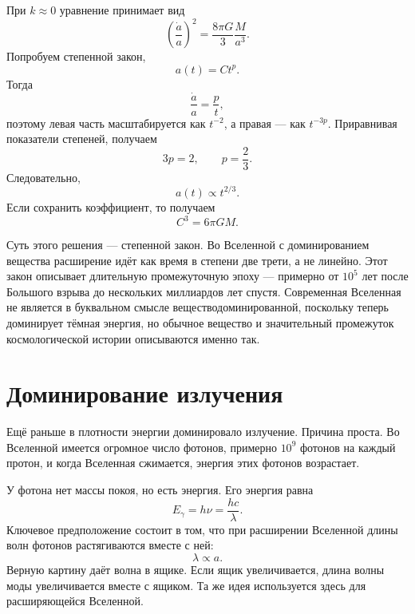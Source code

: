 При \(k\approx 0\) уравнение принимает вид
\begin{equation}
\left(\frac{\dot a}{a}\right)^2=\frac{8\pi G}{3}\frac{M}{a^3}.
\end{equation}
Попробуем степенной закон,
\begin{equation}
a(t)=Ct^p.
\end{equation}
Тогда
\begin{equation}
\frac{\dot a}{a}=\frac{p}{t},
\end{equation}
поэтому левая часть масштабируется как \(t^{-2}\), а правая — как \(t^{-3p}\). Приравнивая показатели степеней, получаем
\begin{equation}
3p=2,
\qquad
p=\frac{2}{3}.
\end{equation}
Следовательно,
\begin{equation}
a(t)\propto t^{2/3}.
\end{equation}
Если сохранить коэффициент, то получаем
\begin{equation}
C^3=6\pi G M.
\end{equation}

Суть этого решения — степенной закон. Во Вселенной с доминированием вещества расширение идёт как время в степени две трети, а не линейно. Этот закон описывает длительную промежуточную эпоху — примерно от \(10^5\) лет после Большого взрыва до нескольких миллиардов лет спустя. Современная Вселенная не является в буквальном смысле веществодоминированной, поскольку теперь доминирует тёмная энергия, но обычное вещество и значительный промежуток космологической истории описываются именно так.

\section{Доминирование излучения}

Ещё раньше в плотности энергии доминировало излучение. Причина проста. Во Вселенной имеется огромное число фотонов, примерно \(10^9\) фотонов на каждый протон, и когда Вселенная сжимается, энергия этих фотонов возрастает.

У фотона нет массы покоя, но есть энергия. Его энергия равна
\begin{equation}
E_\gamma=h\nu=\frac{hc}{\lambda}.
\end{equation}
Ключевое предположение состоит в том, что при расширении Вселенной длины волн фотонов растягиваются вместе с ней:
\begin{equation}
\lambda\propto a.
\end{equation}
Верную картину даёт волна в ящике. Если ящик увеличивается, длина волны моды увеличивается вместе с ящиком. Та же идея используется здесь для расширяющейся Вселенной.


